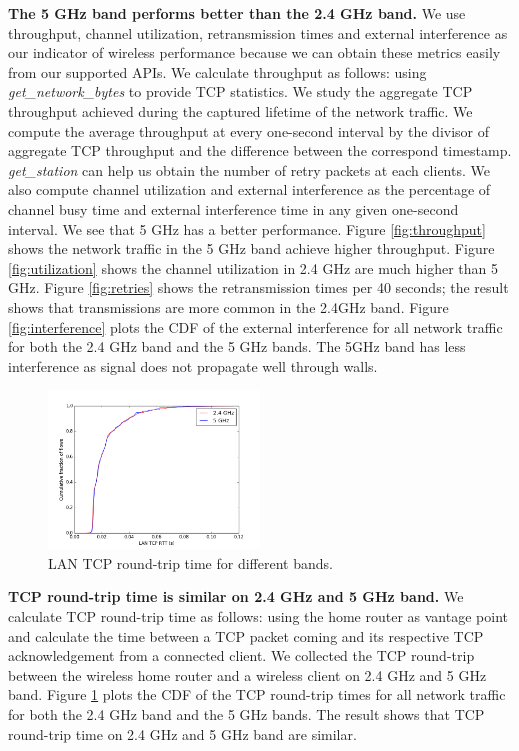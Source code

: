 \textbf{The 5 GHz band performs better than the 2.4 GHz band.} We use throughput, channel utilization, retransmission times and external interference as our indicator of wireless performance because we can obtain these metrics easily from our supported APIs. We calculate throughput as follows: using \textit{get\_network\_bytes} to provide TCP statistics. We study the aggregate TCP throughput achieved during the captured lifetime of the network traffic. We compute the average throughput at every one-second interval by the divisor of aggregate TCP throughput and the difference between the correspond timestamp. \textit{get\_station} can help us obtain the number of retry packets at each clients. We also compute channel utilization and external interference as the percentage of channel busy time and external interference time in any given one-second interval. 
\newline
We see that 5 GHz has a better performance. Figure \ref{fig:throughput} shows the network traffic in the 5 GHz band achieve higher throughput. Figure \ref{fig:utilization} shows the channel utilization in 2.4 GHz are much higher than 5 GHz. Figure \ref{fig:retries} shows the retransmission times per 40 seconds; the result shows that transmissions are more common in the 2.4GHz band. Figure \ref{fig:interference} plots the CDF of the external interference for all network traffic for both the 2.4 GHz band and the 5 GHz bands. The 5GHz band has less interference as signal does not propagate well through walls.

\begin{figure}
\centering
\includegraphics[width=0.5\textwidth]{figure/tcp_rtt.png}
\caption{LAN TCP round-trip time for different bands. } 
\label{fig:tcprtt}
\end{figure}

\textbf{TCP round-trip time is similar on 2.4 GHz and 5 GHz band.} We calculate TCP round-trip time as follows: using the home router as vantage point and calculate the time between a TCP packet coming and its respective TCP acknowledgement from a connected client. We collected the TCP round-trip between the wireless home router and a wireless client on 2.4 GHz and 5 GHz band. Figure \ref{fig:tcprtt} plots the CDF of the TCP round-trip times for all network traffic for both the 2.4 GHz band and the 5 GHz bands. The result shows that TCP round-trip time on 2.4 GHz and 5 GHz band are similar.

